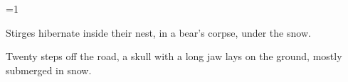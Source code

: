 

\ifnum\value{temperature}=1

  Stirges hibernate inside their nest, in a bear's corpse, under the \gls{snow}.

  \begin{boxtext}
    Twenty \glspl{step} off the road, a skull with a long jaw lays on the ground, mostly submerged in \gls{snow}.
  \end{boxtext}
  \label{\jobname:harvestStirge}

\fi


